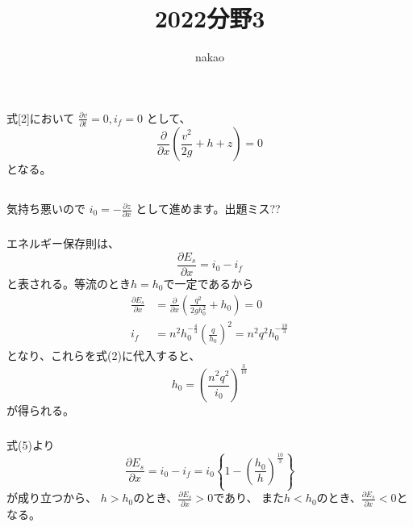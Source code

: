 \documentclass[a4paper]{jsarticle}
\begin{document}
\title{2022分野3}
\author{nakao}
\maketitle

\section{}
\subsection{}
式[2]において
$\frac{\partial v}{\partial t} = 0, i_f = 0$
として、
\begin{equation}
  \frac{\partial}{\partial x}
  \left(\frac{v^2}{2g} + h + z\right) = 0
\end{equation}
となる。

\subsection{}
気持ち悪いので
$i_0 = -\frac{\partial z}{\partial x}$
として進めます。出題ミス??
\subsubsection{}
エネルギー保存則は、
\begin{equation}
  \frac{\partial E_s}{\partial x} = i_0 - i_f
\end{equation}
と表される。等流のとき$h = h_0$で一定であるから
\begin{align}
  \frac{\partial E_s}{\partial x}
  &= \frac{\partial}{\partial x}
  \left(\frac{q^2}{2 g h_0^2} + h_0\right)
  = 0 \\
  i_f &= n^2 h_0^{-\frac{4}{3}} \left(\frac{q}{h_0}\right)^2
  = n^2 q^2 h_0^{-\frac{10}{3}}
\end{align}
となり、これらを式(2)に代入すると、
\begin{equation}
  h_0 = \left(\frac{n^2 q^2}{i_0}\right)^{\frac{3}{10}}
\end{equation}
が得られる。

\subsubsection{}
式(5)より
\begin{equation}
  \frac{\partial E_s}{\partial x}
  = i_0 - i_f
  = i_0 \left\{1 - \left(\frac{h_0}{h}\right)^{\frac{10}{3}}\right\}
\end{equation}
が成り立つから、
$h > h_0$のとき、$\frac{\partial E_s}{\partial x} > 0$であり、
また$h < h_0$のとき、$\frac{\partial E_s}{\partial x} < 0$となる。
\end{document}

